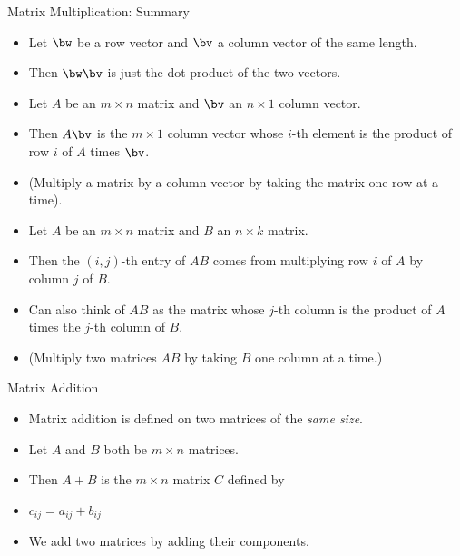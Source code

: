 \documentclass{beamer}
\begin{document}
\begin{frame}{Matrix Multiplication: Summary}

\begin{itemize}
\item Let $\bw$ be a row vector and $\bv$ a column vector of the same length.
\item Then $\bw \bv$ is just the dot product of the two vectors.
\item Let $A$ be an $m\times n$ matrix and $\bv$ an $n\times 1$ column vector.
\item Then $A \bv$ is the $m\times 1$ column vector whose $i$-th element is
the product of row $i$ of $A$ times $\bv$.
\item (Multiply a matrix by a column vector by taking the matrix one row at a time).
\item Let $A$ be an $m\times n$ matrix and $B$ an $n\times k$ matrix.
\item Then the $(i,j)$-th entry of $A B$ comes from multiplying row $i$ of $A$
by column $j$ of $B$.
\item Can also think of $A B$ as the matrix whose $j$-th column is the product
of $A$ times the $j$-th column of $B$.
\item (Multiply two matrices $A B$ by taking $B$ one column at a time.)
\end{itemize}


\end{frame}


\begin{frame}{Matrix Addition}

\begin{itemize}
\item Matrix addition is defined on two matrices of the \emph{same size}.
\item Let $A$ and $B$ both be $m\times n$ matrices.
\item Then $A + B$ is the $m\times n$ matrix $C$ defined by
\item $c_{ij} = a_{ij} + b_{ij}$
\item We add two matrices by adding their components.
\end{itemize}


\end{frame}

\end{document}
